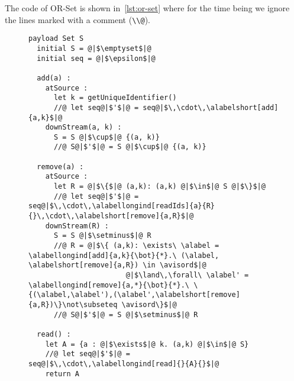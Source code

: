 The code of OR-Set is shown in~\autoref{lst:or-set} where for the time
being we ignore the lines marked with a comment (\lstinline|\\@|).



\begin{figure}[!t]
  \centering
\begin{lstlisting}[caption={Pseudo-code of the OR-Set CRDT},
captionpos=b,label={lst:or-set}] 
  payload Set S 
  initial S = @|$\emptyset$|@ 
  initial seq = @|$\epsilon$|@

  add(a) :
    atSource :
      let k = getUniqueIdentifier()
      //@ let seq@|$'$|@ = seq@|$\,\cdot\,\alabelshort[add]{a,k}$|@
    downStream(a, k) :
      S = S @|$\cup$|@ {(a, k)}
      //@ S@|$'$|@ = S @|$\cup$|@ {(a, k)}

  remove(a) :
    atSource :
      let R = @|$\{$|@ (a,k): (a,k) @|$\in$|@ S @|$\}$|@
      //@ let seq@|$'$|@ = seq@|$\,\cdot\,\alabellongind[readIds]{a}{R}{}\,\cdot\,\alabelshort[remove]{a,R}$|@
    downStream(R) :
      S = S @|$\setminus$|@ R
      //@ R = @|$\{ (a,k): \exists\ \alabel = \alabellongind[add]{a,k}{\bot}{*}.\ (\alabel, \alabelshort[remove]{a,R}) \in \avisord$|@
                       @|$\land\,\forall\ \alabel' = \alabellongind[remove]{a,*}{\bot}{*}.\ \{(\alabel,\alabel'),(\alabel',\alabelshort[remove]{a,R})\}\not\subseteq \avisord\}$|@
      //@ S@|$'$|@ = S @|$\setminus$|@ R

  read() :
    let A = {a : @|$\exists$|@ k. (a,k) @|$\in$|@ S}
    //@ let seq@|$'$|@ = seq@|$\,\cdot\,\alabellongind[read]{}{A}{}$|@
    return A
\end{lstlisting}
\end{figure}

